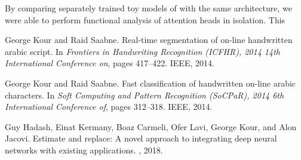 \documentclass{article}
\begin{document}
By comparing separately trained toy models of with the same architecture, we were able to perform functional analysis of attention heads in isolation. This 

  


\begin{thebibliography}{1}

George Kour and Raid Saabne.
\newblock Real-time segmentation of on-line handwritten arabic script.
\newblock In {\em Frontiers in Handwriting Recognition (ICFHR), 2014 14th
  International Conference on}, pages 417--422. IEEE, 2014.

George Kour and Raid Saabne.
\newblock Fast classification of handwritten on-line arabic characters.
\newblock In {\em Soft Computing and Pattern Recognition (SoCPaR), 2014 6th
  International Conference of}, pages 312--318. IEEE, 2014.

Guy Hadash, Einat Kermany, Boaz Carmeli, Ofer Lavi, George Kour, and Alon
  Jacovi.
\newblock Estimate and replace: A novel approach to integrating deep neural
  networks with existing applications.
, 2018.

\end{thebibliography}
\end{document}
